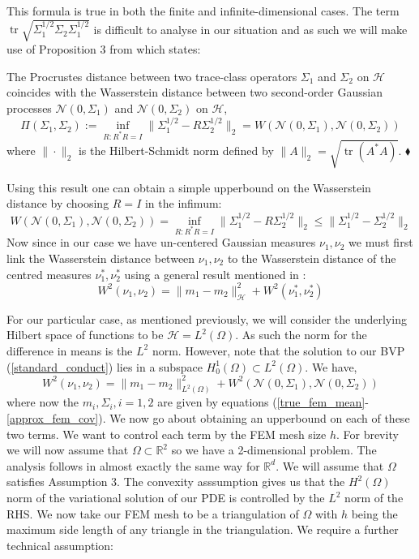 This formula is true in both the finite and infinite-dimensional cases. The term $\operatorname{tr}\sqrt{\Sigma_{1}^{1/2}\Sigma_{2}\Sigma_{1}^{1/2}}$ is difficult to analyse in our situation and as such we will make use of Proposition 3 from \textcolor{blue}{\citep{masarotto2019procrustes}} which states: \vspace{5pt}
\begin{proposition}
    The Procrustes distance between two trace-class operators $\Sigma_{1}$ and $\Sigma_{2}$ on $\mathcal{H}$ coincides with the Wasserstein distance between two second-order Gaussian processes $\mathcal{N}(0,\Sigma_{1})$ and $\mathcal{N}(0,\Sigma_2)$ on $\mathcal{H}$,
    $$\Pi(\Sigma_{1},\Sigma_{2}):=\inf_{R:R^{*}R=I}\|\Sigma_{1}^{1/2}-R\Sigma_{2}^{1/2}\|_{2}=W(\mathcal{N}(0,\Sigma_{1}),\mathcal{N}(0,\Sigma_{2}))$$
    where $\|\cdot\|_{2}$ is the Hilbert-Schmidt norm defined by $\|A\|_{2}=\sqrt{\operatorname{tr}(A^{*}A)}$. $\mathbin{\blacklozenge}$
\end{proposition}

Using this result one can obtain a simple upperbound on the Wasserstein distance by choosing $R=I$ in the infimum:
\begin{equation}
    W(\mathcal{N}(0,\Sigma_1),\mathcal{N}(0,\Sigma_2))=\inf_{R:R^{*}R=I}\|\Sigma_{1}^{1/2}-R\Sigma_{2}^{1/2}\|_{2} \leq \|\Sigma_{1}^{1/2}-\Sigma_{2}^{1/2}\|_{2}
\end{equation}
Now since in our case we have un-centered Gaussian measures $\nu_1,\nu_2$ we must first link the Wasserstein distance between $\nu_1,\nu_2$ to the Wasserstein distance of the centred measures $\nu_{1}^{*},\nu_{2}^{*}$ using a general result mentioned in \textcolor{blue}{\citep{cuesta1996lower}}:
\begin{equation}
    W^{2}(\nu_1,\nu_2)=\|m_1-m_2\|_{\mathcal{H}}^{2}+W^{2}(\nu_{1}^{*},\nu_{2}^{*})
\end{equation}

For our particular case, as mentioned previously, we will consider the underlying Hilbert space of functions to be $\mathcal{H}=L^2(\Omega)$. As such the norm for the difference in means is the $L^2$ norm. However, note that the solution to our BVP (\ref{standard_conduct}) lies in a subspace $H_{0}^{1}(\Omega)\subset L^{2}(\Omega)$. We have,
\begin{equation}
    W^{2}(\nu_1,\nu_2)=\|m_1-m_2\|_{L^{2}(\Omega)}^{2}+W^{2}(\mathcal{N}(0,\Sigma_1),\mathcal{N}(0,\Sigma_2))
\end{equation}
where now the $m_{i},\Sigma_{i}, i=1,2$ are given by equations (\ref{true_fem_mean}-\ref{approx_fem_cov}). We now go about obtaining an upperbound on each of these two terms. We want to control each term by the FEM mesh size $h$. For brevity we will now assume that $\Omega\subset\mathbb{R}^2$ so we have a 2-dimensional problem. The analysis follows in almost exactly the same way for $\mathbb{R}^{d}$. We will assume that $\Omega$ satisfies Assumption 3. The convexity asssumption gives us that the $H^{2}(\Omega)$ norm of the variational solution of our PDE is controlled by the $L^2$ norm of the RHS. We now take our FEM mesh to be a triangulation of $\Omega$ with $h$ being the maximum side length of any triangle in the triangulation. We require a further technical assumption:

